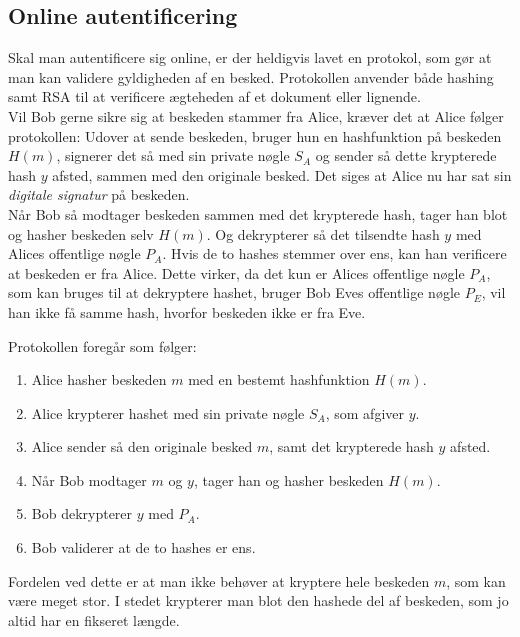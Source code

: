 \subsection{Online autentificering}\label{auth}
Skal man autentificere sig online, er der heldigvis lavet en protokol, som gør at man kan validere gyldigheden af en besked.\cite{dtu}
Protokollen anvender både hashing samt RSA til at verificere ægteheden af et dokument eller lignende.\\
Vil Bob gerne sikre sig at beskeden stammer fra Alice, kræver det at Alice følger protokollen:
Udover at sende beskeden, bruger hun en hashfunktion på beskeden \(H(m)\), signerer det så med sin private nøgle \(S_A\) og sender så dette krypterede hash \(y\) afsted, sammen med den originale besked.
Det siges at Alice nu har sat sin \emph{digitale signatur} på beskeden.\\
Når Bob så modtager beskeden sammen med det krypterede hash, tager han blot og hasher beskeden selv \(H(m)\).
Og dekrypterer så det tilsendte hash \(y\) med Alices offentlige nøgle \(P_A\).
Hvis de to hashes stemmer over ens, kan han verificere at beskeden er fra Alice.
Dette virker, da det kun er Alices offentlige nøgle \(P_A\), som kan bruges til at dekryptere hashet, bruger Bob Eves offentlige nøgle \(P_E\), vil han ikke få samme hash, hvorfor beskeden ikke er fra Eve.
\par
Protokollen foregår som følger:
\begin{enumerate}[label*=(\arabic*)]%
    \item Alice hasher beskeden \(m\) med en bestemt hashfunktion \(H(m)\).
    \item Alice krypterer hashet med sin private nøgle \(S_A\), som afgiver \(y\).
    \item Alice sender så den originale besked \(m\), samt det krypterede hash \(y\) afsted.
    \item Når Bob modtager \(m\) og \(y\), tager han og hasher beskeden \(H(m)\).
    \item Bob dekrypterer \(y\) med \(P_A\).
    \item Bob validerer at de to hashes er ens.
\end{enumerate}

Fordelen ved dette er at man ikke behøver at kryptere hele beskeden \(m\), som kan være meget stor. I stedet krypterer man blot den hashede del af beskeden, som jo altid har en fikseret længde.


